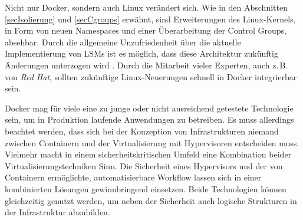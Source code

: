 \documentclass[../main.tex]{subfiles}
\begin{document}
  Nicht nur Docker, sondern auch Linux verändert sich. Wie in den Abschnitten \ref{secIsolierung} und \ref{secCgroups} erwähnt, sind Erweiterungen des Linux-Kernels, in Form von neuen Namespaces und einer Überarbeitung der Control Groups, absehbar. Durch die allgemeine Unzufriedenheit über die aktuelle Implementierung von LSMs ist es möglich, dass diese Architektur zukünftig Änderungen unterzogen wird \cite{seccompLWN}. Durch die Mitarbeit vieler Experten, auch z.\,B. von \emph{Red Hat}, sollten zukünftige Linux-Neuerungen schnell in Docker integrierbar sein.

  Docker mag für viele eine zu junge oder nicht ausreichend getestete Technologie sein, um in Produktion laufende Anwendungen zu betreiben. Es muss allerdings beachtet werden, dass sich bei der Konzeption von Infrastrukturen niemand zwischen Containern und der Virtualisierung mit Hypervisoren entscheiden muss. Vielmehr macht in einem sicherheitskritischen Umfeld eine Kombination beider Virtualisierungstechniken Sinn. Die Sicherheit eines Hypervisors und der von Containern ermöglichte, automatisierbare Workflow lassen sich in einer kombinierten Lösungen gewinnbringend einsetzen. Beide Technologien können gleichzeitig genutzt werden, um neben der Sicherheit auch logische Strukturen in der Infrastruktur abzubilden.





\end{document}
